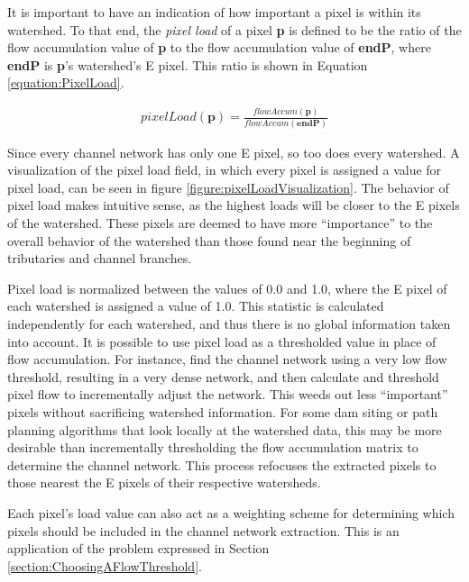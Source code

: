 It is important to have an indication of how important a pixel is within its watershed. To that end, the \emph{pixel load} of a pixel \textbf{p} is defined to be the ratio of the flow accumulation value of \textbf{p} to the flow accumulation value of \textbf{endP}, where \textbf{endP} is \textbf{p}'s watershed's E pixel. This ratio is shown in Equation \ref{equation:PixelLoad}.

\begin{align}
\label{equation:PixelLoad}
  pixelLoad \left( \textbf{p} \right) = \displaystyle\frac{ flowAccum\left( \textbf{p} \right) }{ flowAccum( \textbf{endP} ) }
\end{align}

Since every channel network has only one E pixel, so too does every watershed. A visualization of the pixel load field, in which every pixel is assigned a value for pixel load, can be seen in figure \ref{figure:pixelLoadVisualization}. The behavior of pixel load makes intuitive sense, as the highest loads will be closer to the E pixels of the watershed. These pixels are deemed to have more ``importance'' to the overall behavior of the watershed than those found near the beginning of tributaries and channel branches.

Pixel load is normalized between the values of 0.0 and 1.0, where the E pixel of each watershed is assigned a value of 1.0. This statistic is calculated independently for each watershed, and thus there is no global information taken into account. 
It is possible to use pixel load as a thresholded value in place of flow accumulation. For instance, find the channel network using a very low flow threshold, resulting in a very dense network, and then calculate and threshold pixel flow to incrementally adjust the network. 
This weeds out less ``important'' pixels without sacrificing watershed information. 
For some dam siting or path planning algorithms that look locally at the watershed data, this may be more desirable than incrementally thresholding the flow accumulation matrix to determine the channel network.
This process refocuses the extracted pixels to those nearest the E pixels of their respective watersheds. 

Each pixel's load value can also act as a weighting scheme for determining which pixels should be included in the channel network extraction. This is an application of the problem expressed in Section \ref{section:ChoosingAFlowThreshold}.

